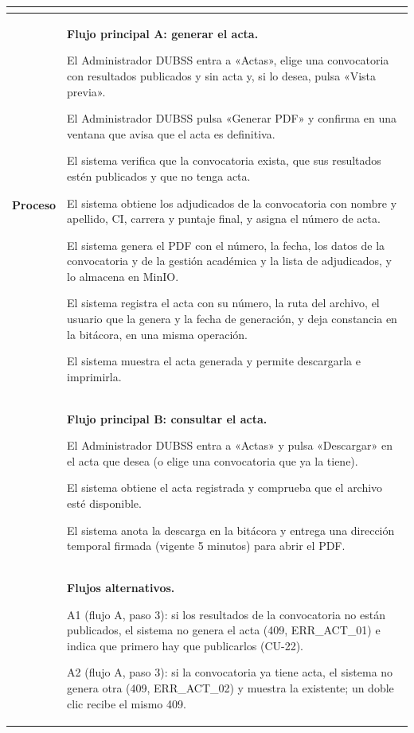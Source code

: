 \begin{longtable}{>{\raggedright\arraybackslash}p{2.9cm} >{\raggedright\arraybackslash}p{12.6cm}}
\begin{cuvin}
\end{cuvin} \\
\midrule
\textbf{Proceso} & \textbf{Flujo principal A: generar el acta.}
\begin{cupasos}
    \item El Administrador DUBSS entra a «Actas», elige una convocatoria con resultados publicados y sin acta y, si lo desea, pulsa «Vista previa».
    \item El Administrador DUBSS pulsa «Generar PDF» y confirma en una ventana que avisa que el acta es definitiva.
    \item El sistema verifica que la convocatoria exista, que sus resultados estén publicados y que no tenga acta.
    \item El sistema obtiene los adjudicados de la convocatoria con nombre y apellido, CI, carrera y puntaje final, y asigna el número de acta.
    \item El sistema genera el PDF con el número, la fecha, los datos de la convocatoria y de la gestión académica y la lista de adjudicados, y lo almacena en MinIO.
    \item El sistema registra el acta con su número, la ruta del archivo, el usuario que la genera y la fecha de generación, y deja constancia en la bitácora, en una misma operación.
    \item El sistema muestra el acta generada y permite descargarla e imprimirla.
\end{cupasos} \\
 & \textbf{Flujo principal B: consultar el acta.}
\begin{cupasos}
    \item El Administrador DUBSS entra a «Actas» y pulsa «Descargar» en el acta que desea (o elige una convocatoria que ya la tiene).
    \item El sistema obtiene el acta registrada y comprueba que el archivo esté disponible.
    \item El sistema anota la descarga en la bitácora y entrega una dirección temporal firmada (vigente 5 minutos) para abrir el PDF.
\end{cupasos} \\
 & \textbf{Flujos alternativos.}
\begin{cuvin}
    \item A1 (flujo A, paso 3): si los resultados de la convocatoria no están publicados, el sistema no genera el acta (409, ERR\_ACT\_01) e indica que primero hay que publicarlos (CU-22).
    \item A2 (flujo A, paso 3): si la convocatoria ya tiene acta, el sistema no genera otra (409, ERR\_ACT\_02) y muestra la existente; un doble clic recibe el mismo 409.

\end{cuvin}
\end{longtable}
